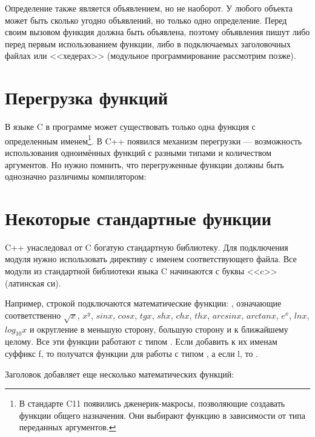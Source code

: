 \documentclass[book.tex]{subfiles}
\begin{document}
Определение также является объявлением, но не наоборот. У любого объекта может быть сколько угодно объявлений, но только одно определение. Перед своим вызовом функция должна быть объявлена, поэтому объявления пишут либо перед первым использованием функции, либо в подключаемых заголовочных файлах или <<хедерах>> (модульное программирование рассмотрим позже).


\section*{Перегрузка функций}

В языке C в программе может существовать только одна функция с определенным именем\footnote{В стандарте C11 появились дженерик-макросы, позволяющие создавать функции общего назначения. Они выбирают функцию в зависимости от типа переданных аргументов.}. В C++ появился механизм перегрузки --- возможность использования одноимённых функций с разными типами и количеством аргументов. Но нужно помнить, что перегруженные функции должны быть однозначно различимы компилятором:


\section*{Некоторые стандартные функции}

C++ унаследовал от C богатую стандартную библиотеку. Для подключения модуля нужно использовать директиву  с именем соответствующего файла. Все модули из стандартной библиотеки языка C начинаются с буквы <<c>> (латинская си).

Например, строкой  подключаются математические функции: , означающие соответственно $\sqrt x$, $x^y$, $sin x$, $cos x$, $tg x$, $sh x$, $ch x$, $th x$, $arcsin x$, $arctan x$, $e^x$, $ln x$, $log_{10}x$ и округление в меньшую сторону, большую сторону и к ближайшему целому. Все эти функции работают с типом . Если добавить к их именам суффикс f, то получатся функции для работы с типом , а если l, то .

Заголовок  добавляет еще несколько математических функций:
\end{document}
